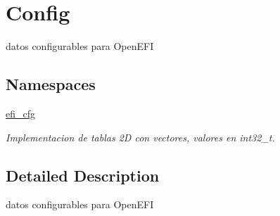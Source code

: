 \hypertarget{group__Config}{}\section{Config}
\label{group__Config}


datos configurables para Open\+E\+FI  


\subsection*{Namespaces}
\begin{DoxyCompactItemize}
\item 
 \hyperlink{namespaceefi__cfg}{efi\+\_\+cfg}
\begin{DoxyCompactList}\small\item\em Implementacion de tablas 2D con vectores, valores en int32\+\_\+t. \end{DoxyCompactList}\end{DoxyCompactItemize}


\subsection{Detailed Description}
datos configurables para Open\+E\+FI 

